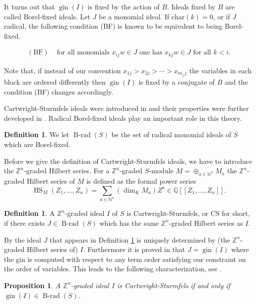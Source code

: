 \documentclass{amsart}
\newtheorem{proposition}[theorem]{Proposition}
\theoremstyle{definition}
\newtheorem{definition}[theorem]{Definition}
\numberwithin{equation}{section}
\DeclareMathOperator{\Brad}{B-rad}
\def\HS{\operatorname{HS}}
\def\gin{\operatorname{gin}}
\def\NN{\mathbb{N}}
\def\QQ{\mathbb{Q}}
\def\ZZ{\mathbb{Z}}
\begin{document}
It turns out that $\gin(I)$ is fixed by the action of $B$.
Ideals fixed by $B$ are called Borel-fixed ideals. Let $J$ be a monomial ideal. 
If $\text{char}(k) = 0$, or if $J$ radical, the following condition (BF) is known to be equivalent to being 
Borel-fixed. 

\begin{align*}
    (\text{BF}) & \text{ for all monomials } x_{ij}w \in J \text{ one has }
    x_{kj}w\in J \text{ for all } k<i.
\end{align*}

Note that, if instead of our convention
$x_{1j}>x_{2j}> \cdots > x_{m_j\,j}$
the variables in each block are ordered differently then $\gin(I)$ is fixed by
a conjugate of $B$ and the condition (BF) changes accordingly.

Cartwright-Sturmfels ideals were introduced in \cite{CDG2} and their properties were
further developed in \cite{CDG1,CDG3,CDG4}.  Radical Borel-fixed ideals play an important role in this theory. 

\begin{definition}  
We let $\Brad(S)$  be the set of radical monomial ideals of $S$ which are
Borel-fixed.
\end{definition} 

Before we give the definition of Cartwright-Sturmfels ideals, we have to 
introduce the $\ZZ^n$-graded Hilbert series.
For a $\ZZ^n$-graded $S$-module $M=\oplus_{a\in \NN^n} M_a$ the $\ZZ^n$-graded Hilbert series of $M$ is defined as the formal
 power series  
$$\HS_M(Z_1,\dots,Z_n)=\sum_{a\in \NN^n} (\dim_K M_a)  Z^a\in\QQ[[Z_1,\dots,Z_n]].$$ 

\begin{definition}
\label{sameHS}
A $\ZZ^n$-graded ideal $I$ of $S$ is Cartwright-Sturmfels, or CS for short, if there exists  $J\in\Brad(S)$  which has the same 
$\ZZ^n$-graded Hilbert series as $I$. 
\end{definition}


By \cite[Theorem 3.5]{CDG1} the ideal $J$ that appears in Definition \ref{sameHS} is uniquely determined by (the $\ZZ^n$-graded Hilbert series of) $I$.  Furthermore it is proved in \cite[Corollary 3.7]{CDG1} that 
$J = \gin(I)$ where the gin is computed with respect to any term order satisfying our constraint on the order of variables. 
This leads to the following characterization, see \cite[Proposition 2.6]{CDG2}.

\begin{proposition}\label{ginRad}
A $\ZZ^n$-graded ideal $I$ is Cartwright-Sturmfels if and only if $\gin(I) \in \Brad(S)$.
\end{proposition} 
\end{document}
